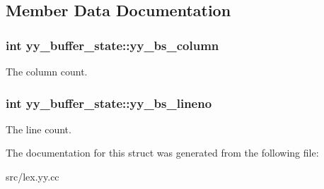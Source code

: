 \subsection{Member Data Documentation}
\hypertarget{structyy__buffer__state_a10c4fcd8be759e6bf11e6d3e8cdb0307}{
\subsubsection[{yy\-\_\-bs\-\_\-column}]{\setlength{\rightskip}{0pt plus 5cm}int yy\-\_\-buffer\-\_\-state\-::yy\-\_\-bs\-\_\-column}}\label{structyy__buffer__state_a10c4fcd8be759e6bf11e6d3e8cdb0307}
The column count. \hypertarget{structyy__buffer__state_a818e94bc9c766e683c60df1e9fd01199}{
\subsubsection[{yy\-\_\-bs\-\_\-lineno}]{\setlength{\rightskip}{0pt plus 5cm}int yy\-\_\-buffer\-\_\-state\-::yy\-\_\-bs\-\_\-lineno}}\label{structyy__buffer__state_a818e94bc9c766e683c60df1e9fd01199}
The line count. 

The documentation for this struct was generated from the following file\-:\begin{DoxyCompactItemize}
\item 
src/lex.\-yy.\-cc\end{DoxyCompactItemize}
